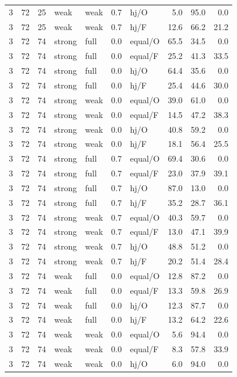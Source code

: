 {\begin{longtable}{@{}rrrllllrrr@{}}
3 & 72 & 25 & weak & weak & 0.7 & hj/O & 5.0 & 95.0 & 0.0\\
3 & 72 & 25 & weak & weak & 0.7 & hj/F & 12.6 & 66.2 & 21.2\\
3 & 72 & 74 & strong & full & 0.0 & equal/O & 65.5 & 34.5 & 0.0\\
3 & 72 & 74 & strong & full & 0.0 & equal/F & 25.2 & 41.3 & 33.5\\
3 & 72 & 74 & strong & full & 0.0 & hj/O & 64.4 & 35.6 & 0.0\\
3 & 72 & 74 & strong & full & 0.0 & hj/F & 25.4 & 44.6 & 30.0\\
3 & 72 & 74 & strong & weak & 0.0 & equal/O & 39.0 & 61.0 & 0.0\\
3 & 72 & 74 & strong & weak & 0.0 & equal/F & 14.5 & 47.2 & 38.3\\
3 & 72 & 74 & strong & weak & 0.0 & hj/O & 40.8 & 59.2 & 0.0\\
3 & 72 & 74 & strong & weak & 0.0 & hj/F & 18.1 & 56.4 & 25.5\\
3 & 72 & 74 & strong & full & 0.7 & equal/O & 69.4 & 30.6 & 0.0\\
3 & 72 & 74 & strong & full & 0.7 & equal/F & 23.0 & 37.9 & 39.1\\
3 & 72 & 74 & strong & full & 0.7 & hj/O & 87.0 & 13.0 & 0.0\\
3 & 72 & 74 & strong & full & 0.7 & hj/F & 35.2 & 28.7 & 36.1\\
3 & 72 & 74 & strong & weak & 0.7 & equal/O & 40.3 & 59.7 & 0.0\\
3 & 72 & 74 & strong & weak & 0.7 & equal/F & 13.0 & 47.1 & 39.9\\
3 & 72 & 74 & strong & weak & 0.7 & hj/O & 48.8 & 51.2 & 0.0\\
3 & 72 & 74 & strong & weak & 0.7 & hj/F & 20.2 & 51.4 & 28.4\\
3 & 72 & 74 & weak & full & 0.0 & equal/O & 12.8 & 87.2 & 0.0\\
3 & 72 & 74 & weak & full & 0.0 & equal/F & 13.3 & 59.8 & 26.9\\
3 & 72 & 74 & weak & full & 0.0 & hj/O & 12.3 & 87.7 & 0.0\\
3 & 72 & 74 & weak & full & 0.0 & hj/F & 13.2 & 64.2 & 22.6\\
3 & 72 & 74 & weak & weak & 0.0 & equal/O & 5.6 & 94.4 & 0.0\\
3 & 72 & 74 & weak & weak & 0.0 & equal/F & 8.3 & 57.8 & 33.9\\
3 & 72 & 74 & weak & weak & 0.0 & hj/O & 6.0 & 94.0 & 0.0\\

\end{longtable}}
